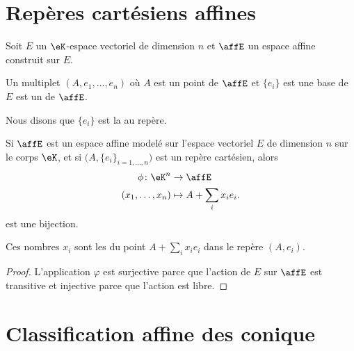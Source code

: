 \section{Repères cartésiens affines}

Soit \( E\) un \( \eK\)-espace vectoriel de dimension \( n\) et \( \affE\) un espace affine construit sur \( E\).
\begin{definition}      \label{DEFooQELZooEXvxgw}
    Un multiplet \( (A,e_1,\ldots, e_n)\) où \( A\) est un point de \( \affE\) et \( \{ e_i \}\) est une base de \( E\) est un  de \( \affE\).

    Nous disons que \( \{ e_i \}\) est la  au repère.
\end{definition}

\begin{proposition}
    Si \( \affE\) est un espace affine modelé sur l'espace vectoriel \( E\) de dimension \( n\) sur le corps \( \eK\), et si \(  \big( A,\{ e_i \}_{i=1,\ldots, n} \big)\) est un repère cartésien, alors
\begin{equation}
    \begin{aligned}
        \phi\colon \eK^n&\to \affE \\
        (x_1,\ldots, x_n)&\mapsto A+\sum_ix_ie_i.
    \end{aligned}
\end{equation}
est une bijection.

Ces nombres \( x_i\) sont les  du point \( A+\sum_ix_ie_i\) dans le repère \( (A,e_i)\).
\end{proposition}

\begin{proof}
    L'application \( \varphi\) est surjective parce que l'action de \( E\) sur \( \affE\) est transitive et injective parce que l'action est libre.
\end{proof}

\section{Classification affine des conique}

